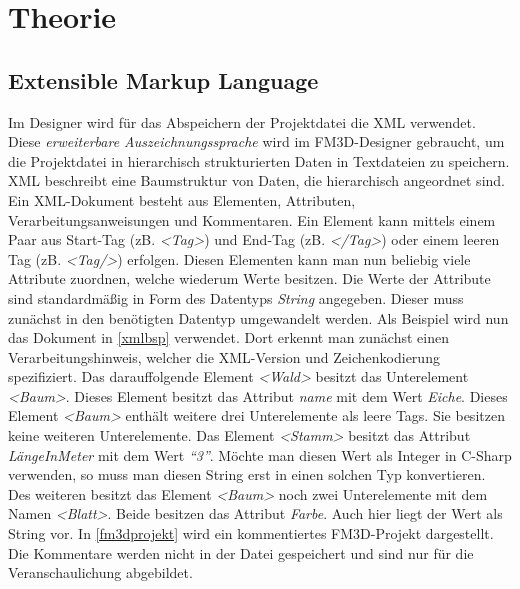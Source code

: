 \chapter{Theorie}
\label{theorie}




\section[Extensible Markup Language]{Extensible Markup Language \cite{xml}\cite{xmlcstutorials}\cite{msdn}}
\label{extensiblemarkuplanguage}

Im Designer wird für das Abspeichern der Projektdatei die \ac{XML} verwendet.  Diese \textit{erweiterbare Auszeichnungssprache} wird im FM3D-Designer gebraucht, um die Projektdatei in hierarchisch strukturierten Daten in Textdateien zu speichern.
\ac{XML} beschreibt eine Baumstruktur von Daten, die hierarchisch angeordnet sind. Ein \ac{XML}-Dokument besteht aus Elementen, Attributen, Verarbeitungsanweisungen und Kommentaren. 
Ein Element kann mittels einem Paar aus Start-Tag (zB. \textit{<Tag>}) und End-Tag (zB. \textit{</Tag>}) oder einem leeren Tag (zB. \textit{<Tag/>}) erfolgen.
Diesen Elementen kann man nun beliebig viele Attribute zuordnen, welche wiederum Werte besitzen.
Die Werte der Attribute sind standardmäßig in Form des Datentyps \textit{String} angegeben. Dieser muss zunächst in den benötigten Datentyp umgewandelt werden.
Als Beispiel wird nun das Dokument in \cref{xmlbsp} verwendet. 
Dort erkennt man zunächst einen Verarbeitungshinweis, welcher die XML-Version und Zeichenkodierung spezifiziert. Das darauffolgende Element \textit{<Wald>} besitzt das Unterelement \textit{<Baum>}. Dieses Element besitzt das Attribut \textit{name} mit dem Wert \textit{Eiche}. 
Dieses Element \textit{<Baum>} enthält weitere drei Unterelemente als leere Tags. Sie besitzen keine weiteren Unterelemente. Das Element \textit{<Stamm>} besitzt das Attribut \textit{LängeInMeter} mit dem Wert \textit{"`3"'}. Möchte man diesen Wert als Integer in C-Sharp verwenden, so muss man diesen String erst in einen solchen Typ konvertieren. Des weiteren besitzt das Element \textit{<Baum>} noch zwei Unterelemente mit dem Namen \textit{<Blatt>}. Beide besitzen das Attribut \textit{Farbe}. Auch hier liegt der Wert als String vor.
In \cref{fm3dprojekt} wird ein kommentiertes FM3D-Projekt dargestellt. Die Kommentare werden nicht in der Datei gespeichert und sind nur für die Veranschaulichung abgebildet.
